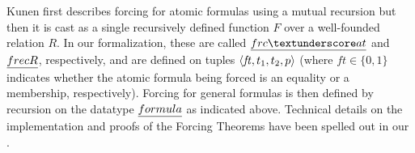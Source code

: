Kunen first describes forcing for atomic formulas using a mutual
recursion
but then \cite[p.~257]{kunen2011set} it is cast as a single
recursively defined function $F$ over a well-founded  relation $R$.
In our formalization, these are called $\frcat$ and 
$\isa{frecR}$, respectively, and are defined on tuples $\langle \mathit{ft},t_1,t_2,p\rangle$ (where
$\mathit{ft}\in\{0,1\}$ indicates whether the atomic formula being
forced is an equality or a membership, respectively).
Forcing for general formulas is then defined by recursion on the
datatype $\formula$ as indicated above. Technical details on the
implementation and proofs of the
Forcing Theorems have been spelled out in our
\cite{2020arXiv200109715G}.

